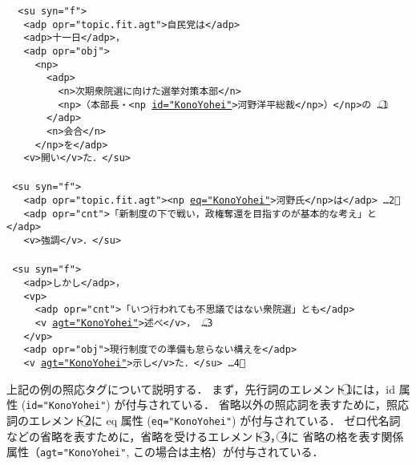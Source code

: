 \documentclass[japanese]{jnlp_1.3e}
\begin{document}
{\small\tt
\noindent
~<su syn="f">\\
~~~<adp opr="topic.fit.agt">自民党は</adp>\\
~~~<adp>十一日</adp>，\\
~~~<adp opr="obj">\\
~~~~~<np>\\
~~~~~~~<adp>\\
~~~~~~~~~<n>次期衆院選に向けた選挙対策本部</n>\\
~~~~~~~~~<np>（本部長・<np \underline{id="KonoYohei"}>河野洋平総裁</np>）</np>の
	\hfill …\textcircled{\small 1}　　　　　\\
~~~~~~~</adp>\\
~~~~~~~<n>会合</n>\\
~~~~~</np>を</adp>\\
~~~<v>開い</v>た．</su>\\
\\
~<su syn="f">\\
~~~<adp opr="topic.fit.agt"><np \underline{eq="KonoYohei"}>河野氏</np>は</adp>
	\hfill …\textcircled{\small 2}　　　　　\\
~~~<adp opr="cnt">「新制度の下で戦い，政権奪還を目指すのが基本的な考え」と</adp>\\
~~~<v>強調</v>．</su>\\
\\
~<su syn="f">\\
~~~<adp>しかし</adp>，\\
~~~<vp>\\
~~~~~<adp opr="cnt">「いつ行われても不思議ではない衆院選」とも</adp>\\
~~~~~<v \underline{agt="KonoYohei"}>述べ</v>，
	\hfill …\textcircled{\small 3}　　　　　\\
~~~</vp>\\
~~~<adp opr="obj">現行制度での準備も怠らない構えを</adp>\\
~~~<v \underline{agt="KonoYohei"}>示し</v>た．</su>
	\hfill …\textcircled{\small 4}　　　　　
}
\vspace{1\baselineskip}


上記の例の照応タグについて説明する．
まず，先行詞のエレメント\textcircled{\small 1}には，id 属性
({\tt id={\linebreak}"KonoYohei"}) が付与されている．
省略以外の照応詞を表すために，照応詞のエレメント\textcircled{\small 2}に
eq 属性 ({\tt eq="KonoYohei"}) が付与されている．
ゼロ代名詞などの省略を表すために，省略を受けるエレメント\textcircled{\small 3}，\textcircled{\small 4}に
省略の格を表す関係属性（{\tt agt="KonoYohei"}, この場合は主格）が付与されている．
\end{document}
